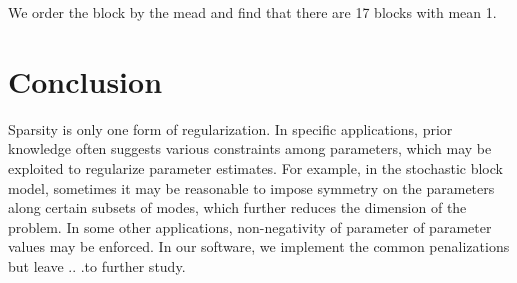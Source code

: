 \documentclass{article}
\begin{document}
We order the block by the mead and find that there are 17 blocks with mean 1.  


\section{Conclusion}
Sparsity is only one form of regularization. In specific applications, prior knowledge often suggests various constraints among parameters, which may be exploited to regularize parameter estimates. For example, in the stochastic block model, sometimes it may be reasonable to impose symmetry on the parameters along certain subsets of modes, which further reduces the dimension of the problem. In some other applications, non-negativity of parameter of parameter values may be enforced. In our software, we implement the common penalizations but leave .. .to further study. 





\end{document}
